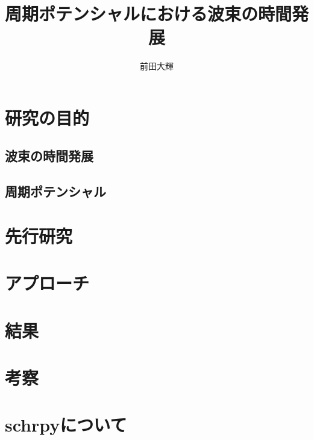 \documentclass[autodetect-engine,dvipdfmx-if-dvi,ja=standard,a4paper]{bxjsreport}
\author{前田大輝}
\title{周期ポテンシャルにおける波束の時間発展}
\begin{document}
    \maketitle
    \chapter{研究の目的}
    \section{波束の時間発展}
    \section{周期ポテンシャル}
    \chapter{先行研究}
    \chapter{アプローチ}
    \chapter{結果}
    \chapter{考察}
    \chapter{schrpyについて}
\end{document}
